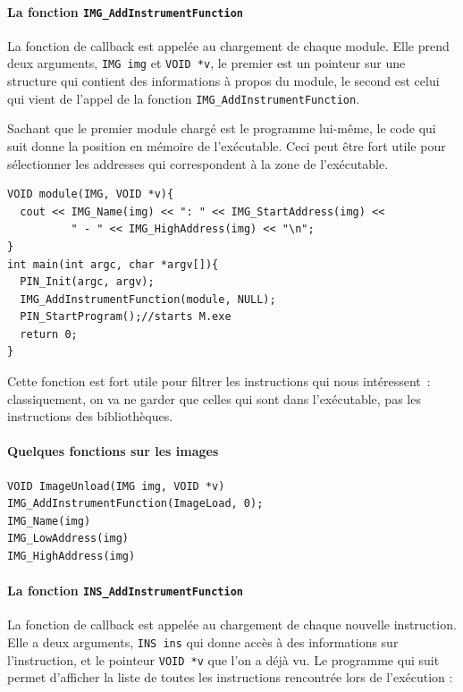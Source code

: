\documentclass{book}
\newcommand{\code}[1]{\texttt{#1}}
\begin{document}
\paragraph{La fonction \code{IMG\_AddInstrumentFunction}} La fonction de callback est appelée au chargement de chaque module. Elle prend deux arguments, \code{IMG img} et \code{VOID *v}, le premier est un pointeur sur une structure qui contient des informations à propos du module, le second est celui qui vient de l'appel de la fonction \code{IMG\_AddInstrumentFunction}. 

Sachant que le premier module chargé est le programme lui-même, le code qui suit donne la position en mémoire de l'exécutable. Ceci peut être fort utile pour sélectionner les addresses qui correspondent à la zone de l'exécutable. 

\begin{verbatim}
VOID module(IMG, VOID *v){
  cout << IMG_Name(img) << ": " << IMG_StartAddress(img) << 
          " - " << IMG_HighAddress(img) << "\n";
}
int main(int argc, char *argv[]){
  PIN_Init(argc, argv);
  IMG_AddInstrumentFunction(module, NULL);
  PIN_StartProgram();//starts M.exe
  return 0;
}
\end{verbatim}

Cette fonction est fort utile pour filtrer les instructions qui nous intéressent~: classiquement, on va ne garder que celles qui sont dans l'exécutable, pas les instructions des bibliothèques. 


 \paragraph{Quelques fonctions sur les images}
\begin{verbatim}
VOID ImageUnload(IMG img, VOID *v)
IMG_AddInstrumentFunction(ImageLoad, 0);
IMG_Name(img)
IMG_LowAddress(img)
IMG_HighAddress(img)
 \end{verbatim}
 
\paragraph{La fonction \code{INS\_AddInstrumentFunction}} La fonction de callback est appelée au chargement de chaque nouvelle instruction. Elle a deux arguments, \code{INS ins} qui donne accès à des informations sur l'instruction, et le pointeur \code{VOID *v} que l'on a déjà vu. Le programme qui suit permet d'afficher la liste de toutes les instructions rencontrée lors de l'exécution : 
\end{document}
